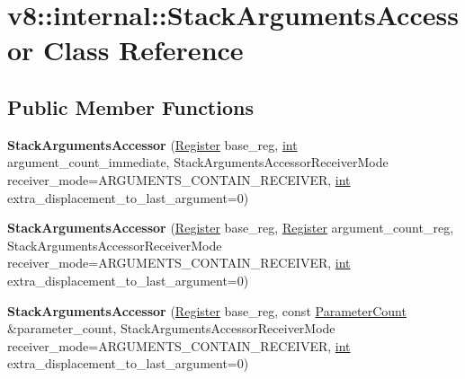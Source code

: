 \hypertarget{classv8_1_1internal_1_1StackArgumentsAccessor}{}\section{v8\+:\+:internal\+:\+:Stack\+Arguments\+Accessor Class Reference}
\label{classv8_1_1internal_1_1StackArgumentsAccessor}
\subsection*{Public Member Functions}
\begin{DoxyCompactItemize}
\item 
\mbox{\label{classv8_1_1internal_1_1StackArgumentsAccessor_a3c6ed12472671c513a5a39fd2b3ed542}} 
{\bfseries Stack\+Arguments\+Accessor} (\mbox{\hyperlink{classv8_1_1internal_1_1Register}{Register}} base\+\_\+reg, \mbox{\hyperlink{classint}{int}} argument\+\_\+count\+\_\+immediate, Stack\+Arguments\+Accessor\+Receiver\+Mode receiver\+\_\+mode=A\+R\+G\+U\+M\+E\+N\+T\+S\+\_\+\+C\+O\+N\+T\+A\+I\+N\+\_\+\+R\+E\+C\+E\+I\+V\+ER, \mbox{\hyperlink{classint}{int}} extra\+\_\+displacement\+\_\+to\+\_\+last\+\_\+argument=0)
\item 
\mbox{\label{classv8_1_1internal_1_1StackArgumentsAccessor_af6dc880739cb48f73092e49feeb6c7da}} 
{\bfseries Stack\+Arguments\+Accessor} (\mbox{\hyperlink{classv8_1_1internal_1_1Register}{Register}} base\+\_\+reg, \mbox{\hyperlink{classv8_1_1internal_1_1Register}{Register}} argument\+\_\+count\+\_\+reg, Stack\+Arguments\+Accessor\+Receiver\+Mode receiver\+\_\+mode=A\+R\+G\+U\+M\+E\+N\+T\+S\+\_\+\+C\+O\+N\+T\+A\+I\+N\+\_\+\+R\+E\+C\+E\+I\+V\+ER, \mbox{\hyperlink{classint}{int}} extra\+\_\+displacement\+\_\+to\+\_\+last\+\_\+argument=0)
\item 
\mbox{\label{classv8_1_1internal_1_1StackArgumentsAccessor_af70717765c77f3ab69c5678b32ac27e0}} 
{\bfseries Stack\+Arguments\+Accessor} (\mbox{\hyperlink{classv8_1_1internal_1_1Register}{Register}} base\+\_\+reg, const \mbox{\hyperlink{classv8_1_1internal_1_1ParameterCount}{Parameter\+Count}} \&parameter\+\_\+count, Stack\+Arguments\+Accessor\+Receiver\+Mode receiver\+\_\+mode=A\+R\+G\+U\+M\+E\+N\+T\+S\+\_\+\+C\+O\+N\+T\+A\+I\+N\+\_\+\+R\+E\+C\+E\+I\+V\+ER, \mbox{\hyperlink{classint}{int}} extra\+\_\+displacement\+\_\+to\+\_\+last\+\_\+argument=0)

\end{DoxyCompactItemize}
